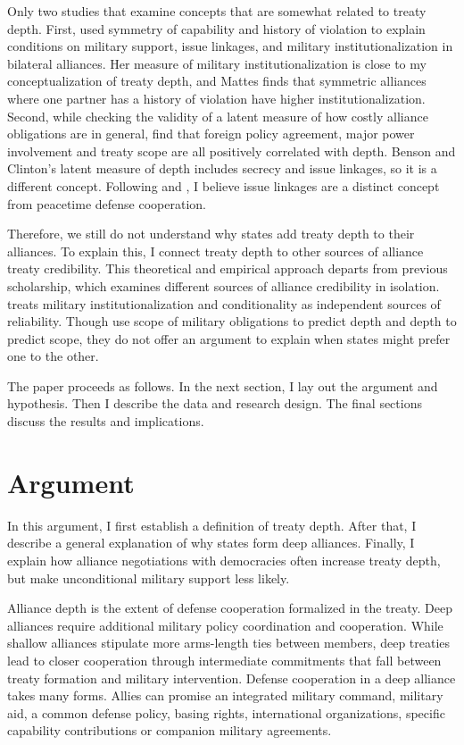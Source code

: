 \documentclass[12pt]{article}
\begin{document}
Only two studies that examine concepts that are somewhat related to treaty depth. 
First, \citet{Mattes2012} used symmetry of capability and history of violation to explain conditions on military support, issue linkages, and military institutionalization in bilateral alliances. 
Her measure of military institutionalization \citep{LeedsAnac2005} is close to my conceptualization of treaty depth, and Mattes finds that symmetric alliances where one partner has a history of violation have higher institutionalization. 
Second, while checking the validity of a latent measure of how costly alliance obligations are in general, \citet{BensonClinton2016} find that foreign policy agreement, major power involvement and treaty scope are all positively correlated with depth.  
Benson and Clinton's latent measure of depth includes secrecy and issue linkages, so it is a different concept. 
Following \citet{Mattes2012} and \citet{Poast2012}, I believe issue linkages are a distinct concept from peacetime defense cooperation.


Therefore, we still do not understand why states add treaty depth to their alliances. 
To explain this, I connect treaty depth to other sources of alliance treaty credibility. 
This theoretical and empirical approach departs from previous scholarship, which examines different sources of alliance credibility in isolation. 
\citet{Mattes2012} treats military institutionalization and conditionality as independent sources of reliability.
Though \citet{BensonClinton2016} use scope of military obligations to predict depth and depth to predict scope, they do not offer an argument to explain when states might prefer one to the other. 


The paper proceeds as follows. 
In the next section, I lay out the argument and hypothesis. 
Then I describe the data and research design. 
The final sections discuss the results and implications. 


\section{Argument}


In this argument, I first establish a definition of treaty depth.  
After that, I describe a general explanation of why states form deep alliances. 
Finally, I explain how alliance negotiations with democracies often increase treaty depth, but make unconditional military support less likely. 


Alliance depth is the extent of defense cooperation formalized in the treaty. 
Deep alliances require additional military policy coordination and cooperation. 
While shallow alliances stipulate more arms-length ties between members, deep treaties lead to closer cooperation through intermediate commitments that fall between treaty formation and military intervention. 
Defense cooperation in a deep alliance takes many forms. 
Allies can promise an integrated military command, military aid, a common defense policy, basing rights, international organizations, specific capability contributions or companion military agreements. 
\end{document}
